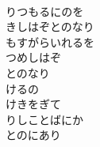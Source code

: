 \documentclass[10pt,b5j]{tarticle} %
\begin{document}
\begin{enumerate}
\begin{minipage}[c]{\blocksize}
    \end{minipage}
    \begin{minipage}[c]{\blocksize}
        
        \vspace{\linespace}
        \item~\\
        りつもるにのを\\
        きしはぞとのなり\\
        もすがらいれるを\\
        つめしはぞ\\
        とのなり\\
        けるの\\
        けきをぎて\\
        りしことばにか\\
        とのにあり
    
    \end{minipage}
\end{enumerate} %
\end{document}
